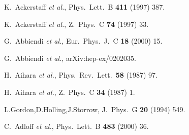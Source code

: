 \documentclass[aps,prl,twocolumn,groupedaddress]{revtex4}
\begin{document}
\begin{thebibliography}{1}
K.~Ackerstaff {\it et al.}, %
Phys.\ Lett.\ B {\bf 411} (1997) 387.

K.~Ackerstaff {\it et al.}, %
Z.\ Phys.\ C {\bf 74} (1997) 33.

G.~Abbiendi {\it et al.}, %
Eur.\ Phys.\ J.\ C {\bf 18} (2000) 15.

G.~Abbiendi {\it et al.}, %
arXiv:hep-ex/0202035.


H.~Aihara {\it et al.}, %
Phys.\ Rev.\ Lett.\  {\bf 58} (1987) 97.

H.~Aihara {\it et al.}, %
Z.\ Phys.\ C {\bf 34} (1987) 1.


L.Gordon,D.Holling,J.Storrow,
J.\ Phys.\ G {\bf 20} (1994) 549.


C.~Adloff {\it et al.}, %
Phys.\ Lett.\ B {\bf 483} (2000) 36.

\end{thebibliography}
\end{document}
